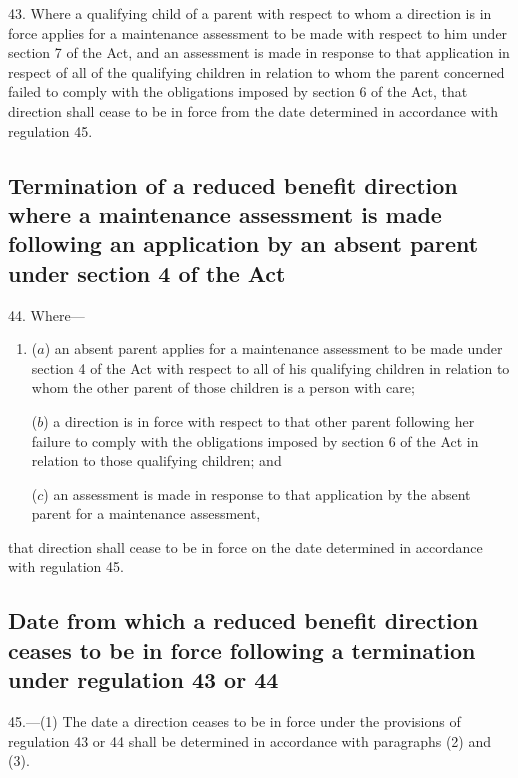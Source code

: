 \documentclass[a4paper]{article}
\begin{document}
43.  Where a qualifying child of a parent with respect to whom a direction is in force applies for a maintenance assessment to be made with respect to him under section 7 of the Act, and an assessment is made in response to that application in respect of all of the qualifying children in relation to whom the parent concerned failed to comply with the obligations imposed by section 6 of the Act, that direction shall cease to be in force from the date determined in accordance with regulation 45.

\subsection[44. Termination of a reduced benefit direction where a maintenance assessment is made following an application by an absent parent under section 4 of the Act]{Termination of a reduced benefit direction where a maintenance assessment is made following an application by an absent parent under section 4 of the Act}

44.  Where—
\begin{enumerate}\item[]
($a$) an absent parent applies for a maintenance assessment to be made under section 4 of the Act with respect to all of his qualifying children in relation to whom the other parent of those children is a person with care;

($b$) a direction is in force with respect to that other parent following her failure to comply with the obligations imposed by section 6 of the Act in relation to those qualifying children; and

($c$) an assessment is made in response to that application by the absent parent for a maintenance assessment,
\end{enumerate}
that direction shall cease to be in force on the date determined in accordance with regulation 45.

\subsection[45. Date from which a reduced benefit direction ceases to be in force following a termination under regulation 43 or 44]{Date from which a reduced benefit direction ceases to be in force following a termination under regulation 43 or 44}

45.—(1) The date a direction ceases to be in force under the provisions of regulation 43 or 44 shall be determined in accordance with paragraphs (2) and (3).
\end{document}
